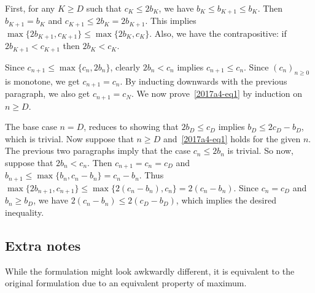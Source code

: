 \documentclass{article}
\begin{document}
First, for any $K \geq D$ such that $c_K \leq 2 b_K$, we have $b_K \leq b_{K + 1} \leq b_K$.
Then $b_{K + 1} = b_K$ and $c_{K + 1} \leq 2 b_K = 2 b_{K + 1}$.
This implies $\max\{2 b_{K + 1}, c_{K + 1}\} \leq \max\{2 b_K, c_K\}$.
Also, we have the contrapositive: if $2 b_{K + 1} < c_{K + 1}$ then $2 b_K < c_K$.

Since $c_{n + 1} \leq \max\{c_n, 2 b_n\}$, clearly $2 b_n < c_n$ implies $c_{n + 1} \leq c_n$.
Since $(c_n)_{n \geq 0}$ is monotone, we get $c_{n + 1} = c_n$.
By inducting downwards with the previous paragraph, we also get $c_{n + 1} = c_N$.
We now prove~\eqref{2017a4-eq1} by induction on $n \geq D$.

The base case $n = D$, reduces to showing that $2 b_D \leq c_D$ implies $b_D \leq 2 c_D - b_D$, which is trivial.
Now suppose that $n \geq D$ and~\eqref{2017a4-eq1} holds for the given $n$.
The previous two paragraphs imply that the case $c_n \leq 2 b_n$ is trivial.
So now, suppose that $2 b_n < c_n$.
Then $c_{n + 1} = c_n = c_D$ and $b_{n + 1} \leq \max\{b_n, c_n - b_n\} = c_n - b_n$.
Thus $\max\{2 b_{n + 1}, c_{n + 1}\} \leq \max\{2 (c_n - b_n), c_n\} = 2 (c_n - b_n)$.
Since $c_n = c_D$ and $b_n \geq b_D$, we have $2 (c_n - b_n) \leq 2 (c_D - b_D)$, which implies the desired inequality.



\subsection*{Extra notes}

While the formulation might look awkwardly different, it is equivalent to the original formulation due to an equivalent property of maximum.
\end{document}
